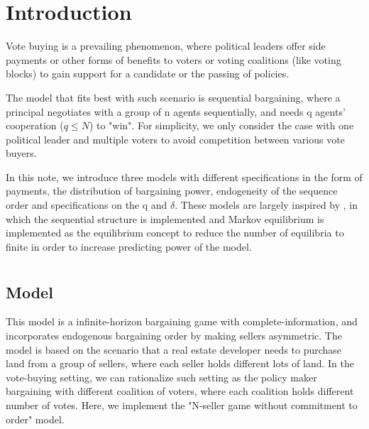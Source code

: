 \documentclass[ProjectGAZ]{subfiles}
\begin{document}



{\titlepagefinish}

\section{Introduction}\label{sec:intro}

Vote buying is a prevailing phenomenon, where political leaders offer side payments or other forms of benefits to voters or voting coalitions (like voting blocks) to gain support for a candidate or the passing of policies.

The model that fits best with such scenario is sequential bargaining, where a principal negotiates with a group of n agents sequentially, and needs q agents' cooperation ($q \leq N$) to "win". For simplicity, we only consider the case with one political leader and multiple voters to avoid competition between various vote buyers.

In this note, we introduce three models with different specifications in the form of payments, the distribution of bargaining power, endogeneity of the sequence order and specifications on the q and $\delta$. These models are largely inspired by \cite{Cai03}, in which the sequential structure is implemented and Markov equilibrium is implemented as the equilibrium concept to reduce the number of equilibria to finite in order to increase predicting power of the model.


\section{\cite{Xiao}}\label{subsec:Xiao}

\subsection{Model}\label{subsec:Xiao-Model}
This model is a infinite-horizon bargaining game with complete-information, and incorporates endogenous bargaining order by making sellers asymmetric. The model is based on the scenario that a real estate developer needs to purchase land from a group of sellers, where each seller holds different lots of land. In the vote-buying setting, we can rationalize such setting as the policy maker bargaining with different coalition of voters, where each coalition holds different number of votes. Here, we implement the "N-seller game without commitment to order" model.
\end{document}
